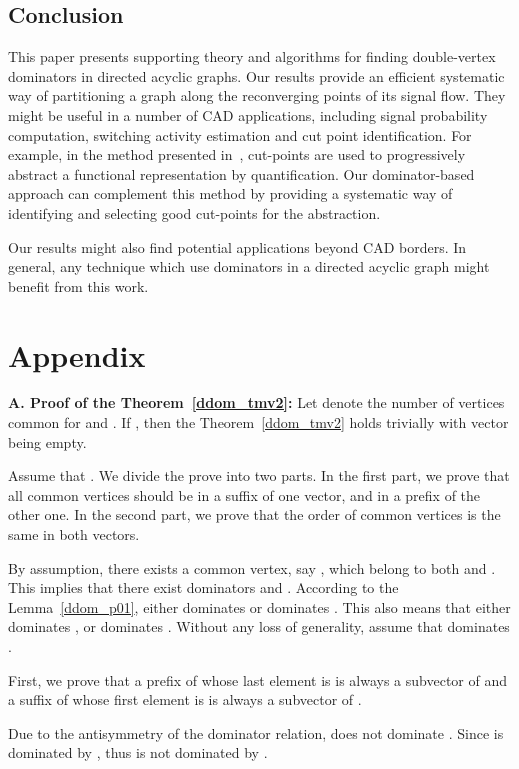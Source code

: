 \documentclass{llncs}
\begin{document}
\section{Conclusion}
\label{ddom_con}
This paper presents supporting theory and algorithms for finding double-vertex dominators in directed acyclic graphs. Our results provide an efficient systematic way of partitioning a graph along the reconverging points of its signal flow. They might be useful in a number of CAD applications, including signal probability computation, switching activity estimation and cut
point identification. For example, in the method presented in~\cite{KhMKH01},
cut-points are used to progressively abstract a functional
representation by quantification.  Our dominator-based approach can
complement this method by providing a systematic way of identifying and selecting 
good cut-points for the abstraction.

Our results might also find potential applications beyond CAD borders.  In
general, any technique which use dominators in a directed acyclic graph 
might benefit from this work.




\chapter*{Appendix}
{\bf A. Proof of the Theorem~\ref{ddom_tmv2}:}
Let  denote the number of vertices common for  and . 
If , then the Theorem~\ref{ddom_tmv2} holds trivially with vector
 being empty.

Assume that . We divide the prove into two parts. In the first
part, we prove that all  common vertices should be in a suffix
of one vector, and in a prefix of the other one. In the second part, we
prove that the order of common vertices is the same in both vectors. 

By assumption, there exists a common vertex, say , which
belong to both  and .
This implies that there exist dominators  and
. According to the Lemma~\ref{ddom_p01}, either
 dominates  or  dominates .
This also means that either  dominates , or
 dominates . Without any loss of
generality, assume that  dominates .

First, we prove that a prefix of  whose last element is 
is always a subvector of  and a suffix of  whose first 
element is  is always a subvector of .

Due to the antisymmetry of the dominator relation,  does not
dominate . Since  is dominated by
, thus  is not dominated by .
\end{document}
